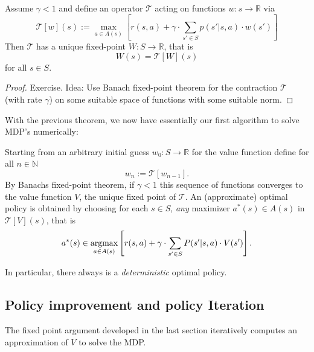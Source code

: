 \begin{theorem}
    Assume \( \gamma < 1  \) and define an operator \( \mathcal{T} \) acting on functions 
    \( w: s \to \mathbb{R} \) via 
    \[
        \mathcal{T}[w](s) := \max_{a \in A(s)}\left[ r(s,a) + \gamma \cdot \sum_{s' \in S} p(s' | s,a) \cdot w(s') \right]
    \]
    Then \( \mathcal{T} \) has a unique fixed-point \( W: S \to \mathbb{R} \), that is
    \[
        W(s) = \mathcal{T}[W](s)
    \]
    for all \( s \in S \).
\end{theorem}
\begin{proof}
    Exercise. Idea: Use Banach fixed-point theorem for the contraction \( \mathcal{T} \) (with rate \( \gamma \)) on some suitable space of functions with some suitable norm.
\end{proof}



With the previous theorem, we now have essentially our first algorithm to solve MDP's numerically:

Starting from an arbitrary initial guess \( w_{0}: S \to \mathbb{R} \) for the value function define for all \( n \in \mathbb{N} \)
\[
    w_n := \mathcal{T}[w_{n-1}].
\]
By Banachs fixed-point theorem, if \( \gamma < 1\) this sequence of functions converges to the value function \( V \), the unique fixed point of \( \mathcal{T} \).
An (approximate) optimal policy is obtained by choosing for each \( s \in S \), \textit{any} maximizer \( a^*(s) \in A(s) \) in \( \mathcal{T}[V](s) \), that is 
\[
    a^*(s) \in \operatorname*{argmax}_{a \in A(s)} \left[ r(s,a) + \gamma \cdot \sum_{s' \in S} P(s' | s,a) \cdot V(s') \right].
\]

In particular, there always is a \emph{deterministic} optimal policy.














\subsection{Policy improvement and policy Iteration}

The fixed point argument developed in the last section iteratively computes an approximation of \( V \) to solve the MDP.

